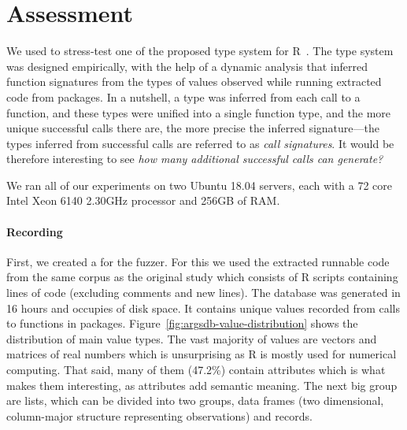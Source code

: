 \documentclass[sigplan,nonacm,anonymous,review]{acmart}
\begin{document}


\section{Assessment}
\label{sec:assessment}


We used \tool to stress-test one of the proposed type system for
R~\cite{turcotte2020designing}.  The type system was designed
empirically, with the help of a dynamic analysis that inferred
function signatures from the types of values observed while running
extracted code from packages.  In a nutshell, a type was inferred from
each call to a function, and these types were unified into a single
function type, and the more unique successful calls there are, the
more precise the inferred signature---the types inferred from
successful calls are referred to as \textit{call signatures}.  It
would be therefore interesting to see \emph{how many additional
successful calls can \tool generate?}

We ran all of our experiments on two Ubuntu 18.04 servers, each with a
72 core Intel Xeon 6140 2.30GHz processor and 256GB of RAM.

\paragraph{Recording}

First, we created a \sxpdb for the fuzzer.
For this we used the extracted runnable code from the same corpus as the original study which consists of \DBNumSourceFiles R scripts containing \DBSourceLinesOfCodeRnd lines of code (excluding comments and new lines).
The database was generated in 16 hours and occupies \DBFileSize of disk space.
It contains \DBValuesRnd unique values recorded from \DBNumCallsRnd calls to \DBNumFunctionsRnd functions in \DBNumPackages packages.
Figure~\ref{fig:argsdb-value-distribution} shows the distribution of main value types.
The vast majority of values are vectors and matrices of real numbers which is unsurprising as R is mostly used for numerical computing.
That said, many of them (47.2\%) contain attributes which is what makes them interesting, as attributes add semantic meaning.
The next big group are lists, which can be divided into two groups, data frames (two dimensional, column-major structure representing observations) and records.
\end{document}
